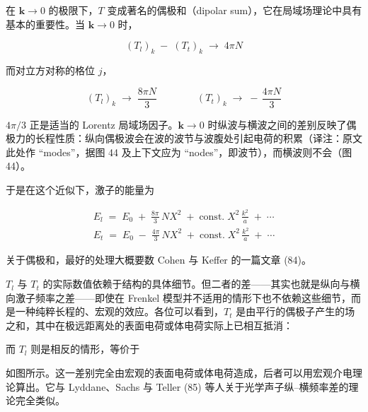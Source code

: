 在 $\mathbf{k}\to 0$ 的极限下，$T$ 变成著名的偶极和（dipolar sum），它在局域场理论中具有基本的重要性。当 $\mathbf{k}\to 0$ 时，

\begin{equation*}
(T_l)_k \;-\; (T_t)_k \;\to\; 4\pi N
\end{equation*}

而对立方对称的格位 $j$，

\begin{equation*}
(T_l)_k \;\to\; \frac{8\pi N}{3} \qquad\qquad (T_t)_k \;\to\; -\,\frac{4\pi N}{3}
\end{equation*}

$4\pi/3$ 正是适当的 Lorentz 局域场因子。$\mathbf{k}\to 0$ 时纵波与横波之间的差别反映了偶极力的长程性质：纵向偶极波会在波的波节与波腹处引起电荷的积累（译注：原文此处作 “modes”，据图 44 及上下文应为 “nodes”，即波节），而横波则不会（图 44）。


于是在这个近似下，激子的能量为

\begin{gather*}
E_l \;=\; E_0 \;+\; \frac{8\pi}{3}\, N X^{2} \;+\; \text{const.}\; X^{2}\, \frac{k^{2}}{a} \;+\; \cdots \\
E_t \;=\; E_0 \;-\; \frac{4\pi}{3}\, N X^{2} \;+\; \text{const.}\; X^{2}\, \frac{k^{2}}{a} \;+\; \cdots
\end{gather*}

关于偶极和，最好的处理大概要数 Cohen 与 Keffer 的一篇文章 (84)。

$T_l$ 与 $T_t$ 的实际数值依赖于结构的具体细节。但二者的差——其实也就是纵向与横向激子频率之差——即使在 Frenkel 模型并不适用的情形下也不依赖这些细节，而是一种纯粹长程的、宏观的效应。各位可以看到，$T_t$ 是由平行的偶极子产生的场之和，其中在极远距离处的表面电荷或体电荷实际上已相互抵消：


而 $T_l$ 则是相反的情形，等价于


如图所示。这一差别完全由宏观的表面电荷或体电荷造成，后者可以用宏观介电理论算出。它与 Lyddane、Sachs 与 Teller (85) 等人关于光学声子纵–横频率差的理论完全类似。

